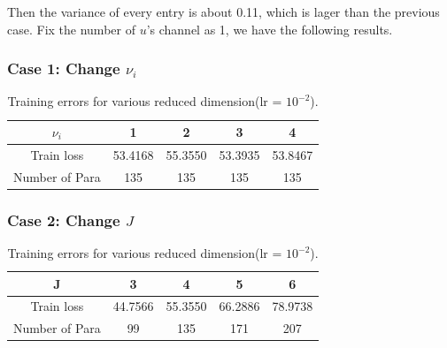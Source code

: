 Then the variance of every entry is about 0.11, which is lager than the previous case. Fix the number of $u$'s channel as 1, we have the following results.

\subsubsection{Case 1: Change $\nu_i$}
\begin{table}[H]
	\begin{center}
		\begin{tabular}{|c|c|c|c|c|}
			\hline
			$\nu_i$& 1& 2 & 3& 4 \\
			\hline
			Train loss & 53.4168 & 55.3550 & 53.3935 & 53.8467\\
			\hline
			Number of Para & 135 & 135 & 135 & 135\\
			\hline
		\end{tabular}\caption{Training errors for various reduced dimension(lr = $10^{-2}$).}
	\end{center}
\end{table}
\subsubsection{Case 2: Change $J$}
\begin{table}[H]
	\begin{center}
		\begin{tabular}{|c|c|c|c|c|}
			\hline
			J& 3& 4 & 5& 6 \\
			\hline
			Train loss & 44.7566 & 55.3550 & 66.2886& 78.9738\\
			\hline
			Number of Para & 99 & 135 & 171 & 207\\
			\hline
		\end{tabular}\caption{Training errors for various reduced dimension(lr = $10^{-2}$).}
	\end{center}
\end{table}
